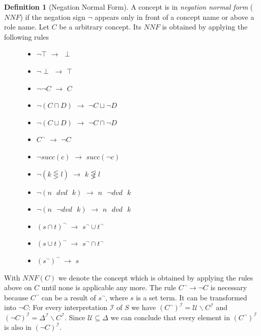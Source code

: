\documentclass[a4paper,11pt]{scrartcl}
\theoremstyle{break}
\theoremstyle{definition}
\newtheorem{mydef}{Definition}
\begin{document}
\begin{mydef}[Negation Normal Form]
A concept is in \textit{negation normal form} ($NNF$) if the negation sign $\neg$ appears only in front of a concept name or above a role name. Let $C$ be a arbitrary concept. Its $NNF$ is obtained by applying the following rules
\begin{figure}[H]
\begin{minipage}[t]{.5\textwidth}
\raggedright
\begin{itemize}
\item $\neg\top$ $\rightarrow$ $\perp$
\item $\neg\perp$ $\rightarrow$ $\top$
\item $\neg\neg C$ $\rightarrow$ $C$
\item $\neg(C\sqcap D)$ $\rightarrow$ $\neg C \sqcup \neg D$
\item $\neg(C\sqcup D)$ $\rightarrow$ $\neg C \sqcap \neg D$
\item $C^\neg$ $\rightarrow$ $\neg C$
\item $\neg succ(c)$ $\rightarrow$ $succ(\neg c)$
\end{itemize}
\end{minipage}%
\begin{minipage}[t]{.5\textwidth}
\raggedleft
\begin{itemize}
\item $\neg (k\lesseqgtr l)$ $\rightarrow$ $k\not\lesseqgtr l$
\item $\neg (n\text{ } dvd \text{ } k)$ $\rightarrow$ $n\text{ } \neg dvd \text{ } k$
\item $\neg (n\text{ } \neg dvd \text{ } k)$ $\rightarrow$ $n\text{ } dvd \text{ } k$
\item $(s\cap t)^\neg$ $\rightarrow$ $s^\neg \cup t^\neg$
\item $(s\cup t)^\neg$ $\rightarrow$ $s^\neg \cap t^\neg$
\item $(s^\neg)^\neg$ $\rightarrow$ $s$
\end{itemize}
\end{minipage}
\end{figure}
\end{mydef}
With $NNF(C)$ we denote the concept which is obtained by applying the rules above on $C$ until none is applicable any more. The rule $C^\neg\rightarrow \neg C$ is necessary because $C^\neg$ can be a result of $s^\neg$, where $s$ is a set term. It can be transformed into $\neg C$: For every interpretation $\mathcal{I}$ of $S$ we have $(C^\neg)^\mathcal{I}=\mathcal{U}\backslash C^\mathcal{I}$ and $(\neg C)^\mathcal{I}=\Delta^\mathcal{I}\backslash C^\mathcal{I}$. Since $\mathcal{U}\subseteq \Delta$ we can conclude that every element in $(C^\neg)^\mathcal{I}$ is also in $(\neg C)^\mathcal{I}$.
\end{document}
